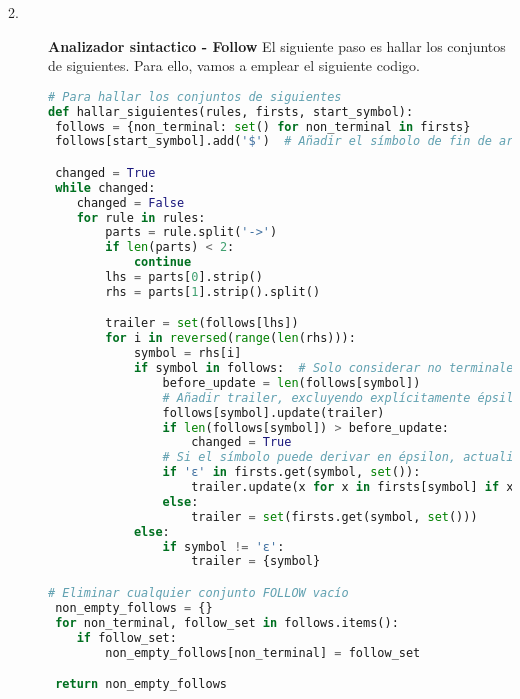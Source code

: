 \documentclass{article}
\begin{document}
\begin{description}
\item[2. ] \textbf{Analizador sintactico - Follow} El siguiente paso es hallar los conjuntos de siguientes. Para ello, vamos a emplear el siguiente codigo.

\begin{lstlisting}[language=Python, caption=Funcion: Hallar conjuntos de siguientes]
# Para hallar los conjuntos de siguientes
def hallar_siguientes(rules, firsts, start_symbol):
 follows = {non_terminal: set() for non_terminal in firsts}
 follows[start_symbol].add('$')  # Añadir el símbolo de fin de archivo al FOLLOW del símbolo de inicio

 changed = True
 while changed:
    changed = False
    for rule in rules:
        parts = rule.split('->')
        if len(parts) < 2:
            continue
        lhs = parts[0].strip()
        rhs = parts[1].strip().split()

        trailer = set(follows[lhs])
        for i in reversed(range(len(rhs))):
            symbol = rhs[i]
            if symbol in follows:  # Solo considerar no terminales
                before_update = len(follows[symbol])
                # Añadir trailer, excluyendo explícitamente épsilon si está presente
                follows[symbol].update(trailer)
                if len(follows[symbol]) > before_update:
                    changed = True
                # Si el símbolo puede derivar en épsilon, actualizar el trailer
                if 'ε' in firsts.get(symbol, set()):
                    trailer.update(x for x in firsts[symbol] if x != 'ε')
                else:
                    trailer = set(firsts.get(symbol, set()))
            else:
                if symbol != 'ε':
                    trailer = {symbol}

# Eliminar cualquier conjunto FOLLOW vacío
 non_empty_follows = {}
 for non_terminal, follow_set in follows.items():
    if follow_set:
        non_empty_follows[non_terminal] = follow_set

 return non_empty_follows
\end{lstlisting}
\end{description}
\end{document}
